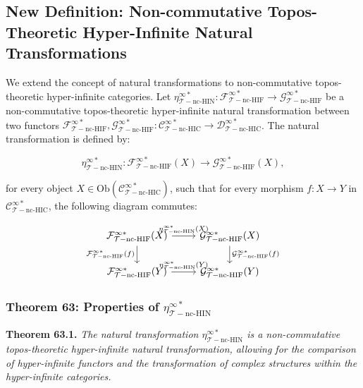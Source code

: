 \documentclass{article}
\begin{document}
\subsection{New Definition: Non-commutative Topos-Theoretic Hyper-Infinite Natural Transformations}
We extend the concept of natural transformations to non-commutative topos-theoretic hyper-infinite categories. Let \(\eta_{\mathcal{T}-\text{nc-HIN}}^{\infty *}: \mathcal{F}_{\mathcal{T}-\text{nc-HIF}}^{\infty *} \to \mathcal{G}_{\mathcal{T}-\text{nc-HIF}}^{\infty *}\) be a non-commutative topos-theoretic hyper-infinite natural transformation between two functors \(\mathcal{F}_{\mathcal{T}-\text{nc-HIF}}^{\infty *}, \mathcal{G}_{\mathcal{T}-\text{nc-HIF}}^{\infty *}: \mathcal{C}_{\mathcal{T}-\text{nc-HIC}}^{\infty *} \to \mathcal{D}_{\mathcal{T}-\text{nc-HIC}}^{\infty *}\). The natural transformation is defined by:

\[
\eta_{\mathcal{T}-\text{nc-HIN}}^{\infty *}: \mathcal{F}_{\mathcal{T}-\text{nc-HIF}}^{\infty *}(X) \to \mathcal{G}_{\mathcal{T}-\text{nc-HIF}}^{\infty *}(X),
\]

for every object \(X \in \text{Ob}(\mathcal{C}_{\mathcal{T}-\text{nc-HIC}}^{\infty *})\), such that for every morphism \(f: X \to Y\) in \(\mathcal{C}_{\mathcal{T}-\text{nc-HIC}}^{\infty *}\), the following diagram commutes:

\[
\begin{tikzcd}
\mathcal{F}_{\mathcal{T}-\text{nc-HIF}}^{\infty *}(X) \arrow[r, "\eta_{\mathcal{T}-\text{nc-HIN}}^{\infty *}(X)"] \arrow[d, "\mathcal{F}_{\mathcal{T}-\text{nc-HIF}}^{\infty *}(f)"'] & \mathcal{G}_{\mathcal{T}-\text{nc-HIF}}^{\infty *}(X) \arrow[d, "\mathcal{G}_{\mathcal{T}-\text{nc-HIF}}^{\infty *}(f)"] \\
\mathcal{F}_{\mathcal{T}-\text{nc-HIF}}^{\infty *}(Y) \arrow[r, "\eta_{\mathcal{T}-\text{nc-HIN}}^{\infty *}(Y)"] & \mathcal{G}_{\mathcal{T}-\text{nc-HIF}}^{\infty *}(Y)
\end{tikzcd}
\]

\subsubsection{Theorem 63: Properties of \(\eta_{\mathcal{T}-\text{nc-HIN}}^{\infty *}\)}
\textbf{Theorem 63.1.} \textit{The natural transformation \(\eta_{\mathcal{T}-\text{nc-HIN}}^{\infty *}\) is a non-commutative topos-theoretic hyper-infinite natural transformation, allowing for the comparison of hyper-infinite functors and the transformation of complex structures within the hyper-infinite categories.}
\end{document}
